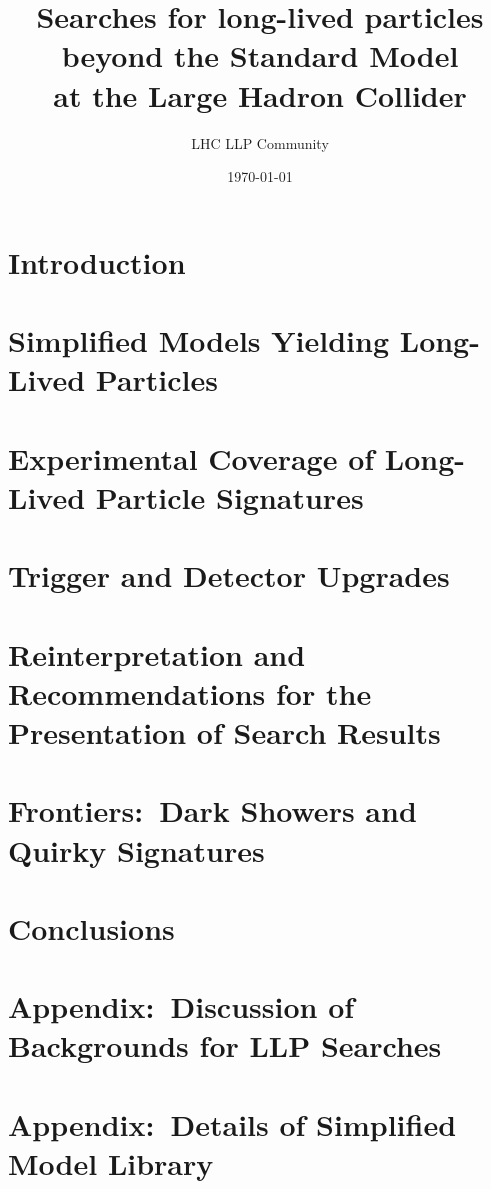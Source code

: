 \documentclass[a4paper,debug,notitlepage,nobib]{tufte-book}
\title{Searches for long-lived particles beyond the Standard Model \\ \smallskip \noindent at the Large Hadron Collider}
\author{LHC LLP Community}
\date{\today}
\begin{document}
\setcounter{secnumdepth}{3} %



\setcounter{tocdepth}{1}
\tableofcontents
 

\chapter{Introduction}
\label{sec:Introduction}


\chapter{Simplified Models Yielding Long-Lived Particles}
\label{sec:simplifiedmodel}


\chapter{Experimental Coverage of Long-Lived Particle Signatures}
\label{sec:experimentcoverage}


\chapter{Trigger and Detector Upgrades}
\label{sec:triggers}


\chapter{Reinterpretation and Recommendations for the Presentation of Search Results}
\label{sec:reint}





 



\chapter{Frontiers:~Dark Showers and Quirky Signatures}
\label{sec:showers}


\chapter{Conclusions}
\label{sec:conclusions}


\appendix

\chapter{Appendix:~Discussion of Backgrounds for LLP Searches}
\label{sec:backgrounds}


\chapter{Appendix:~Details of Simplified Model Library}
\label{sec:library_more}


\printbibliography
\end{document}
